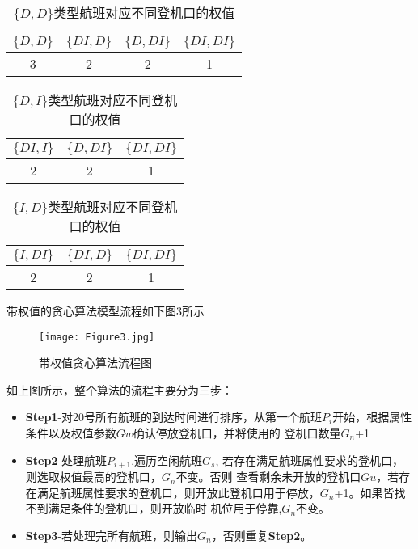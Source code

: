 \documentclass[bwprint]{gmcmthesis}
\begin{document}
\begin{table*}[!h]
    \centering
    \caption{$\{D, D\}$类型航班对应不同登机口的权值}
    \begin{tabular}{|c|c|c|c|}
        \hline
        $\{D, D\}$ & $\{DI, D\}$ & $\{D, DI\}$ & $\{DI, DI\}$\\
        \hline
        3&2&2&1\\
        \hline
    \end{tabular}
\end{table*}
\begin{table*}[!h]
    \centering
    \caption{$\{D, I\}$类型航班对应不同登机口的权值}
    \begin{tabular}{|c|c|c|}
        \hline
        $\{DI, I\}$ & $\{D, DI\}$ & $\{DI, DI\}$\\
        \hline
        2&2&1\\
        \hline
    \end{tabular}
\end{table*}

\begin{table*}[!h]
    \centering
    \caption{$\{I, D\}$类型航班对应不同登机口的权值}
    \begin{tabular}{|c|c|c|}
        \hline
        $\{I, DI\}$ & $\{DI, D\}$ & $\{DI, DI\}$\\
        \hline
        2&2&1\\
        \hline
    \end{tabular}
\end{table*}

带权值的贪心算法模型流程如下图3所示
\begin{figure}[!h]
\centering
\texttt{[image: Figure3.jpg]}
\caption{带权值贪心算法流程图}
\end{figure}
如上图所示，整个算法的流程主要分为三步：
\begin{itemize}
\item \textbf{Step1}-对20号所有航班的到达时间进行排序，从第一个航班$P_{i}$开始，根据属性条件以及权值参数$Gw$确认停放登机口，并将使用的
登机口数量$G_{n}$+1
\item \textbf{Step2}-处理航班$P_{i+1}$,遍历空闲航班$G_{s}$, 若存在满足航班属性要求的登机口，则选取权值最高的登机口，$G_{n}$不变。否则
查看剩余未开放的登机口$Gu$，若存在满足航班属性要求的登机口，则开放此登机口用于停放，$G_{n}$+1。如果皆找不到满足条件的登机口，则开放临时
机位用于停靠,$G_{n}$不变。
\item \textbf{Step3}-若处理完所有航班，则输出$G_{n}$，否则重复\textbf{Step2}。
\end{itemize}
\end{document}
